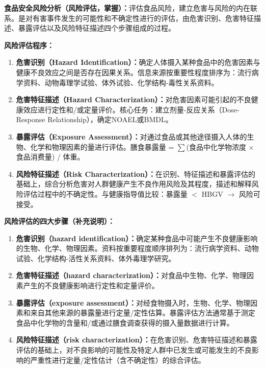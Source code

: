 \begin{keybox}
\textbf{食品安全风险分析（风险评估，掌握）：}评估食品风险，建立危害与风险的内在联系。是对有害事件发生的可能性和不确定性进行的评估，由危害识别、危害特征描述、暴露评估以及风险特征描述四个步骤组成的过程。

\textbf{风险评估程序：}
\begin{enumerate}[leftmargin=*]
    \item \textbf{危害识别（Hazard Identification）：}确定人体摄入某种食品中的危害因素与健康不良效应之间是否存在因果关系。信息来源按重要性程度排序为：流行病学资料、动物毒理学试验、体外试验、化学结构-毒性关系资料。

    \item \textbf{危害特征描述（Hazard Characterization）：}对危害因素可能引起的不良健康效应进行定性和/或定量评价。核心任务：建立剂量-反应关系（Dose-Response Relationship），确定NOAEL或BMDL。

    \item \textbf{暴露评估（Exposure Assessment）：}对通过食品或其他途径摄入人体的生物、化学和物理因素的量进行评估。膳食暴露量 = $\sum$(食品中化学物浓度 $\times$ 食品消费量) / 体重。

    \item \textbf{风险特征描述（Risk Characterization）：}在识别、特征描述和暴露评估的基础上，综合分析危害对人群健康产生不良作用风险及其程度，描述和解释风险评估过程中的不确定性。与健康指导值比较：暴露量 $<$ HBGV $\to$ 风险可接受。
\end{enumerate}
\end{keybox}

\begin{tipbox}
\textbf{风险评估的四大步骤（补充说明）：}
\begin{enumerate}[leftmargin=*]
    \item \textbf{危害识别（hazard identification）：}确定某种食品中可能产生不良健康影响的生物、化学、物理因素。资料按重要程度顺序排列为：流行病学资料、动物试验、化学结构-活性关系资料、体外毒理学研究。
    \item \textbf{危害特征描述（hazard characterization）：}对食品中生物、化学、物理因素产生的不良健康影响进行定性和定量评价。
    \item \textbf{暴露评估（exposure assessment）：}对经食物摄入时，生物、化学、物理因素和来自其他来源的暴露量进行定量/定性估算。暴露评估方法通常基于测定食品中化学物的含量和/或通过膳食调查获得的摄入量数据进行计算。
    \item \textbf{风险特征描述（risk characterization）：}在危害识别、危害特征描述和暴露评估的基础上，对不良影响的可能性及特定人群中已发生或可能发生的不良影响的严重性进行定量/定性估计（含不确定性）的综合评估。
\end{enumerate}
\end{tipbox}

